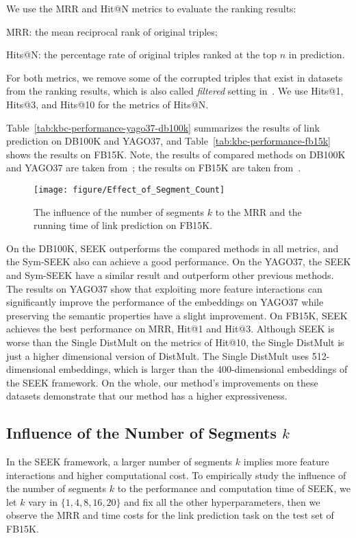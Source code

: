 \documentclass[11pt,a4paper]{article}
\begin{document}
We use the MRR and Hit@N metrics to evaluate the ranking results:
\begin{enumerate*}[label={\alph*)}]
	\item MRR: the mean reciprocal rank of original triples;
	\item Hits@N: the percentage rate of original triples ranked at the top $n$ in prediction.
\end{enumerate*}
For both metrics, we remove some of the corrupted triples that exist in datasets from the ranking results, which is also called \emph{filtered} setting in~\cite{bordes2013translating}. We use Hits@1, Hits@3, and Hits@10 for the metrics of Hits@N.

Table~\ref{tab:kbc-performance-yago37-db100k} summarizes the results of link prediction on DB100K and YAGO37, and Table~\ref{tab:kbc-performance-fb15k} shows the results on FB15K. Note, the results of compared methods on DB100K and YAGO37 are taken from~\cite{boyang2018:aer,guo2018:RUGE}; the results on FB15K are taken from~\cite{kadlec2017knowledge,boyang2018:aer,kazemi2018simple,sun2018rotate,DBLP:conf/acl/XuL19}.


\begin{figure}[!h]
	\centering
	\texttt{[image: figure/Effect\_of\_Segment\_Count]}
	\caption{The influence of the number of segments $k$ to the MRR and the running time of link prediction on FB15K.}
	\label{fig:Seg_count}
\end{figure}

On the DB100K, SEEK outperforms the compared methods in all metrics, and the Sym-SEEK also can achieve a good performance. On the YAGO37, the SEEK and Sym-SEEK have a similar result and outperform other previous methods. The results on YAGO37 show that exploiting more feature interactions can significantly improve the performance of the embeddings on YAGO37 while preserving the semantic properties have a slight improvement. On FB15K, SEEK achieves the best performance on MRR, Hit@1 and Hit@3. 
Although SEEK is worse than the Single DistMult on the metrics of Hit@10, the Single DistMult is just a higher dimensional version of DistMult. The Single DistMult uses 512-dimensional embeddings, which is larger than the 400-dimensional embeddings of the SEEK framework. 
On the whole, our method's improvements on these datasets demonstrate that our method has a higher expressiveness.



\subsection{Influence of the Number of Segments $k$}
In the SEEK framework, a larger number of segments $k$ implies more feature interactions and higher computational cost. To empirically study the influence of the number of segments $k$ to the performance and computation time of SEEK, we let $k$ vary in $\{1, 4, 8, 16, 20\}$ and fix all the other hyperparameters, then we observe the MRR and time costs for the link prediction task on the test set of FB15K. 
\end{document}
